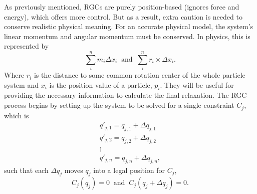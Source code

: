 \documentclass[12pt, letterpaper]{article}
\begin{document}
As previously mentioned, RGCs are purely position-based (ignores force and energy), which offers more control. But as a result, extra caution is needed to conserve realistic physical meaning. For an accurate physical model, the system’s linear momentum and angular momentum must be conserved. In physics, this is represented by 
\begin{equation}
    \sum\limits_{i}^{n} m_{i} \Delta x_{i} \; \;  
    \text{and} \; \; \sum\limits_{i}^{n} r_{i} \times \Delta x_{i}.
\end{equation}
Where $r_{i}$ is the distance to some common rotation center of the whole particle system and $x_i$ is the position value of a particle, $p_i$. They will be useful for providing the necessary information to calculate the final relaxation. The RGC process begins by setting up the system to be solved for a single constraint $C_j$, which is
\begin{equation*}
    \begin{gathered}
        q'_{j,1} = q_{j,1} + \Delta q_{j,1}\\
        q'_{j,2} = q_{j,2} + \Delta q_{j,2}\\
        \vdots\\
        q'_{j,n} = q_{j,n} + \Delta q_{j,n},
    \end{gathered}
\end{equation*}
such that each $\Delta q_j$ moves $q_j$ into a legal position for $C_j$,
\begin{equation}
    C_j(q_{j}) = 0 \; \; \text{and} \; \; C_j(q_{j} + \Delta q_{j}) = 0.
\end{equation}
\end{document}
